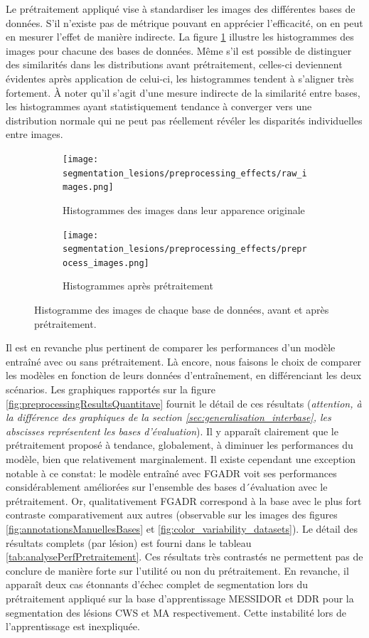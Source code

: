 Le prétraitement appliqué vise à standardiser les images des différentes bases de données. S'il n'existe pas de métrique pouvant en apprécier l'efficacité, on en peut en mesurer l'effet de manière indirecte. La figure \ref{fig:colorHistogramDatasets} illustre les histogrammes des images pour chacune des bases de données. Même s'il est possible de distinguer des similarités dans les distributions avant prétraitement, celles-ci deviennent évidentes après application de celui-ci, les histogrammes tendent à s'aligner très fortement. À noter qu'il s'agit d'une mesure indirecte de la similarité entre bases, les histogrammes ayant statistiquement tendance à converger vers une distribution normale qui ne peut pas réellement révéler les disparités individuelles entre images.
\begin{figure}[H]
	\begin{subfigure}{.5\textwidth}
		\texttt{[image: segmentation\_lesions/preprocessing\_effects/raw\_images.png]}
		\caption{Histogrammes des images dans leur apparence originale}
	\end{subfigure}
	\begin{subfigure}{.5\textwidth}
		\texttt{[image: segmentation\_lesions/preprocessing\_effects/preprocess\_images.png]}
		\caption{Histogrammes après prétraitement}
	\end{subfigure}
	\caption{Histogramme des images de chaque base de données, avant et après prétraitement.}
	\label{fig:colorHistogramDatasets}
\end{figure}

Il est en revanche plus pertinent de comparer les performances d'un modèle entraîné avec ou sans prétraitement. Là encore, nous faisons le choix de comparer les modèles en fonction de leurs données d'entraînement, en différenciant les deux scénarios. Les graphiques rapportés sur la figure \ref{fig:preprocessingResultsQuantitave} fournit le détail de ces résultats (\textit{attention, à la différence des graphiques de la section \ref{sec:generalisation_interbase}, les abscisses représentent les bases d'évaluation}). Il y apparaît clairement que le prétraitement proposé à tendance, globalement, à diminuer les performances du modèle, bien que relativement marginalement. Il existe cependant une exception notable à ce constat: le modèle entraîné avec \ac{FGADR} voit ses performances considérablement améliorées sur l'ensemble des bases d´évaluation avec le prétraitement. Or, qualitativement \ac{FGADR} correspond à la base avec le plus fort contraste comparativement aux autres (observable sur les images des figures \ref{fig:annotationsManuellesBases} et \ref{fig:color_variability_datasets}). Le détail des résultats complets (par lésion) est fourni dans le tableau  \ref{tab:analysePerfPretraitement}. Ces résultats très contrastés ne permettent pas de conclure de manière forte sur l'utilité ou non du prétraitement. En revanche, il apparaît deux cas étonnants d'échec complet de segmentation lors du prétraitement appliqué sur la base d'apprentissage MESSIDOR et DDR pour la segmentation des lésions \ac{CWS} et \ac{MA} respectivement. Cette instabilité lors de l'apprentissage est inexpliquée.

